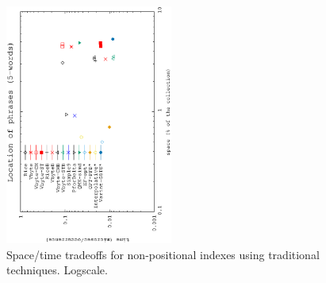 \documentclass[review]{elsarticle}
\begin{document}
\begin{figure}[t]
\begin{center}
\includegraphics[angle=-90,width=0.49\textwidth]{../figures/f1/phrases5-5/nonpos-5_5.eps}
\caption{Space/time tradeoffs for non-positional indexes using traditional
techniques. Logscale.}
\label{fig:nonpos}
\end{center}
\end{figure}
\end{document}
